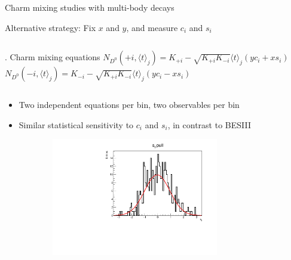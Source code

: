 \documentclass[xcolor={dvipsnames}]{beamer}
\begin{document}
\begin{frame}{Charm mixing studies with multi-body decays}
  \begin{center}
    {\large Alternative strategy: Fix $x$ and $y$, and measure $c_i$ and $s_i$}
  \end{center}
  \vspace{-0.2cm}
  \begin{columns}
    \begin{column}{0.65\textwidth}
      \begin{block}{. Charm mixing equations}
        $N_{D^0}(+i, \langle t\rangle_j) = K_{+i} - \sqrt{K_{+i}K_{-i}}\langle t\rangle_j(yc_i + xs_i)$ \\
        $N_{D^0}(-i, \langle t\rangle_j) = K_{-i} - \sqrt{K_{+i}K_{-i}}\langle t\rangle_j(yc_i - xs_i)$
      \end{block}
    \end{column}
  \end{columns}
  \vspace{0.1cm}
  \begin{itemize}
    \item{Two independent equations per bin, two observables per bin}
    \item{Similar statistical sensitivity to $c_i$ and $s_i$, in contrast to BESIII}
  \end{itemize}
  \vspace{-0.2cm}
  \begin{figure}[htb]
    \centering
    \begin{subfigure}{0.5\textwidth}
      \centering
      \includegraphics[width=0.8\textwidth]{Plots/s_1_pull_hist.pdf}
    \end{subfigure}%
    \begin{subfigure}{0.5\textwidth}
      \centering

\end{subfigure}
\end{figure}
\end{frame}
\end{document}
